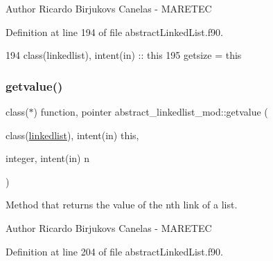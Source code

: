\begin{DoxyAuthor}{Author}
Ricardo Birjukovs Canelas -\/ M\+A\+R\+E\+T\+EC 
\end{DoxyAuthor}


Definition at line 194 of file abstract\+Linked\+List.\+f90.


\begin{DoxyCode}
194     \textcolor{keywordtype}{class}(linkedlist), \textcolor{keywordtype}{intent(in)} :: this
195     getsize = this%
\end{DoxyCode}
\mbox{\label{namespaceabstract__linkedlist__mod_a3c3ad627fd9f87da9831c53802975104}} 
\subsubsection{\texorpdfstring{getvalue()}{getvalue()}}
{\footnotesize\ttfamily class($\ast$) function, pointer abstract\+\_\+linkedlist\+\_\+mod\+::getvalue (\begin{DoxyParamCaption}\item[{class(\mbox{\hyperlink{structabstract__linkedlist__mod_1_1linkedlist}{linkedlist}}), intent(in)}]{this,  }\item[{integer, intent(in)}]{n }\end{DoxyParamCaption})\hspace{0.3cm}{\ttfamily [private]}}



Method that returns the value of the nth link of a list. 

\begin{DoxyAuthor}{Author}
Ricardo Birjukovs Canelas -\/ M\+A\+R\+E\+T\+EC 
\end{DoxyAuthor}


Definition at line 204 of file abstract\+Linked\+List.\+f90.


